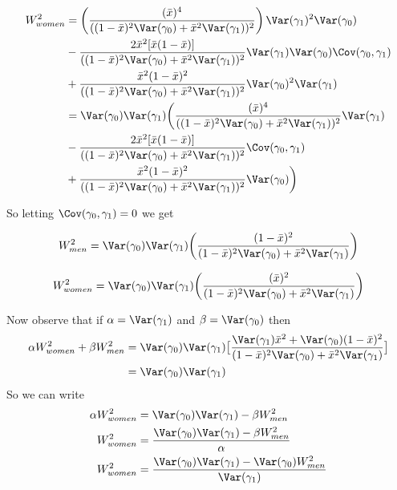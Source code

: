 \begin{align*}
	W_{women}^2 &= \left(\frac{(\bar{x})^4}{((1-\bar{x})^2 \Var(\gamma_0) + \bar{x}^2 \Var(\gamma_1))^2}\right)\Var(\gamma_1)^2 \Var(\gamma_0)  \\
				& -  \frac{2 \bar{x}^2[\bar{x} (1-\bar{x})]}{((1-\bar{x})^2 \Var(\gamma_0) + \bar{x}^2 \Var(\gamma_1))^2} \Var(\gamma_1) \Var(\gamma_0) \Cov(\gamma_0, \gamma_1)  \\
				& + \frac{\bar{x}^2 (1-\bar{x})^2}{((1-\bar{x})^2 \Var(\gamma_0) + \bar{x}^2 \Var(\gamma_1))^2} \Var(\gamma_0)^2 \Var(\gamma_1) \\
				&= \Var(\gamma_0) \Var(\gamma_1) \bigg(\frac{(\bar{x})^4}{((1-\bar{x})^2 \Var(\gamma_0) + \bar{x}^2 \Var(\gamma_1))^2}\Var(\gamma_1) \\
				& -  \frac{2 \bar{x}^2[\bar{x} (1-\bar{x})]}{((1-\bar{x})^2 \Var(\gamma_0) + \bar{x}^2 \Var(\gamma_1))^2} \Cov(\gamma_0, \gamma_1)  \\
				& + \frac{\bar{x}^2 (1-\bar{x})^2}{((1-\bar{x})^2 \Var(\gamma_0) + \bar{x}^2 \Var(\gamma_1))^2} \Var(\gamma_0) \bigg) \\
\end{align*} 


So letting $\Cov(\gamma_0, \gamma_1) = 0$ we get

\begin{align*}
	W_{men}^2 &= \Var(\gamma_0) \Var(\gamma_1) \bigg(\frac{(1 - \bar{x})^2 }{(1-\bar{x})^2 \Var(\gamma_0) + \bar{x}^2 \Var(\gamma_1)} \bigg) \\
\end{align*} 

\begin{align*}
	W_{women}^2 &= \Var(\gamma_0) \Var(\gamma_1) \bigg(\frac{(\bar{x})^2 }{(1-\bar{x})^2 \Var(\gamma_0) + \bar{x}^2 \Var(\gamma_1)} \bigg) \\
\end{align*} 



Now observe that if $\alpha = \Var(\gamma_1)$ and $\beta = \Var(\gamma_0)$ then
\begin{align*}
	\alpha W_{women}^2 + \beta W_{men}^2 &= \Var(\gamma_0) \Var(\gamma_1) \big[ \frac{\Var(\gamma_1) \bar{x}^2 + \Var(\gamma_0) (1- \bar{x})^2}{(1-\bar{x})^2 \Var(\gamma_0) + \bar{x}^2 \Var(\gamma_1)} \big] \\
										 &= \Var(\gamma_0) \Var(\gamma_1)
\end{align*} 
So we can write
\begin{align*}
	\alpha W^{2}_{women} &= \Var(\gamma_0) \Var(\gamma_1) - \beta W^{2}_{men} \\
	W^{2}_{women} &= \frac{\Var(\gamma_0) \Var(\gamma_1) - \beta W^{2}_{men}}{\alpha} \\
	W^{2}_{women} &= \frac{\Var(\gamma_0) \Var(\gamma_1) - \Var(\gamma_0) W^{2}_{men}}{\Var(\gamma_1)} \\
\end{align*} 

